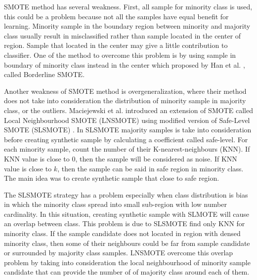 SMOTE method has several weakness.
First, all sample for minority class is used, this could be a problem because
not all the samples have equal benefit for learning.
Minority sample in the boundary region between minority and majority class
usually result in misclassified rather than sample located in the center of
region.
Sample that located in the center may give a little contribution to classifier.
One of the method to overcome this problem is by using sample in boundary of
minority class instead in the center which proposed by Han et al.
\cite{han2005borderline}, called Borderline SMOTE.

Another weakness of SMOTE method is overgeneralization, where their method does
not take into consideration the distribution of minority sample in majority
class, or the outliers.
Maciejewski et al. introduced an extension of SMOTE called Local Neighbourhood
SMOTE (LNSMOTE) \cite{maciejewski2011local}
using modified version of Safe-Level SMOTE (SLSMOTE)
\cite{bunkhumpornpat2009safe}.
In SLSMOTE majority samples is take into consideration before creating
synthetic sample by calculating a coefficient called safe-level.
For each minority sample, count the number of their K-nearest-neighbours (KNN).
If KNN value is close to 0, then the sample will be considered as noise.
If KNN value is close to $k$, then the sample can be said in safe region in
minority class.
The main idea was to create synthetic sample that close to safe region.

The SLSMOTE strategy has a problem especially when class distribution is bias
in which the minority class spread into small sub-region with low number
cardinality.
In this situation, creating synthetic sample with SLMOTE will cause an overlap
between class.
This problem is due to SLSMOTE find only KNN for minority class.
If the sample candidate does not located in region with densed minority class,
then some of their neighbours could be far from sample candidate or surrounded
by majority class samples.
LNSMOTE overcome this overlap problem by taking into consideration the local
neighbourhood of minority sample candidate that can provide the number of of
majority class around each of them.
